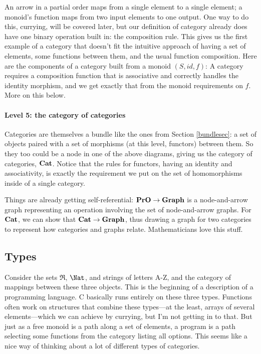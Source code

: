 \documentclass[11pt]{article}
\begin{document}
An arrow in a partial order maps from a single element to a single element; a monoid's
function maps from two input elements to one output. One way to do this, currying, will be
covered later, but our definition of category already does have one binary operation
built in: the composition rule. This gives us the first example of a category that
doesn't fit the intuitive approach of having a set of elements, some functions between
them, and the usual function composition. Here are the components of a category built
from a monoid $(S, id, f)$:
A category requires a composition function that is associative and correctly handles the
identity morphism, and we get exactly that from the monoid requirements on $f$. More on
this below.

\paragraph{Level 5: the category of categories}
Categories are themselves a bundle like the ones from Section \ref{bundlesec}: a set
of objects paired with a set of morphisms (at this level, functors) between them. So
they too could be a node in one of the above diagrams, giving us the category of
categories, ${\bf Cat}$. Notice that the rules for functors, having an identity and
associativity, is exactly the requirement we put on the set of homomorphisms inside
of a single category.

Things are already getting self-referential: ${\bf PrO}\to {\bf Graph}$ is a
node-and-arrow graph representing an operation involving the set of node-and-arrow
graphs. For ${\bf Cat}$, we can show that ${\bf Cat}\to {\bf Graph}$, thus drawing a
graph for two categories to represent how categories and graphs relate.  Mathematicians
love this stuff.

\subsection{Types} Consider the sets $\Re$, $\Nat$, and strings of letters A-Z, and the
category of mappings between these three objects. This is the beginning of a description
of a programming language. C basically runs entirely on these three types. Functions often
work on structures that combine these types---at the least, arrays of several
elements---which we can achieve by currying, but I'm not getting in to that. But just as a
free monoid is a path along a set of elements, a program is a path selecting some
functions from the category listing all options. This seems like a nice way of thinking
about a lot of different types of categories.
\end{document}
